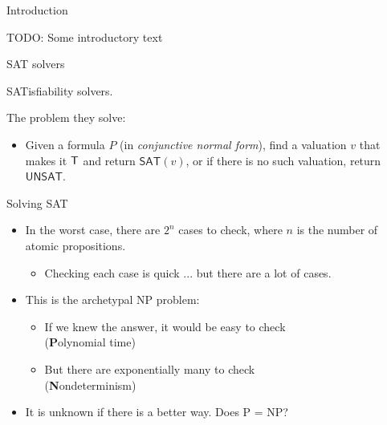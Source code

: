 \documentclass[xetex,aspectratio=169,14pt,hyperref={pdfpagelabels=true,pdflang={en-GB}}]{beamer}
\begin{document}
\frame{\titlepage}


\begin{frame}
  {Introduction}

  TODO: Some introductory text
\end{frame}


\begin{frame}
  {SAT solvers}

  SATisfiability solvers.

  \bigskip

  The problem they solve:
  \begin{itemize}
  \item Given a formula $P$ (in \emph{conjunctive normal form}), find
    a valuation $v$ that makes it $\mathsf{T}$ and return
    $\mathsf{SAT}(v)$, or if there is no such valuation, return
    $\mathsf{UNSAT}$.
  \end{itemize}
\end{frame}

\begin{frame}
  {Solving SAT}

  \begin{itemize}
  \item In the worst case, there are $2^n$ cases to check, where $n$
    is the number of atomic propositions.
    \begin{itemize}
    \item Checking each case is quick ... but there are a lot of cases.
    \end{itemize}
  \item This is the archetypal NP problem:
    \begin{itemize}
    \item If we knew the answer, it would be easy to check \\
      \qquad (\textbf{P}olynomial time)
    \item But there are exponentially many to check \\
      \qquad (\textbf{N}ondeterminism)
    \end{itemize}
  \item It is unknown if there is a better way. Does P = NP?
  \end{itemize}
\end{frame}
\end{document}
